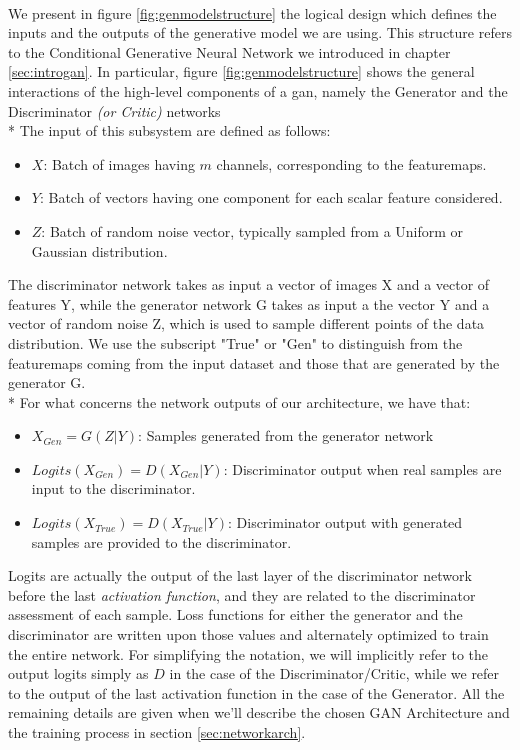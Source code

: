 \paragraph{} We present in figure \ref{fig:genmodelstructure} the logical design which defines the inputs and the outputs of the generative model we are using. This structure refers to the Conditional Generative Neural Network we introduced in chapter \ref{sec:introgan}. In particular, figure \ref{fig:genmodelstructure} shows the general interactions of the high-level components of a \gls{gan}, namely the Generator and the Discriminator \textit{(or Critic)} networks \\* The input of this subsystem are defined as follows:
\begin{itemize}
	\item $X$: Batch of images having $m$ channels, corresponding to the \glspl{featuremap}.
	\item $Y$: Batch of vectors having one component for each scalar feature considered.
	\item $Z$: Batch of random noise vector, typically sampled from a Uniform or Gaussian distribution.
\end{itemize}

The discriminator network takes as input a vector of images X and a vector of features Y, while the generator network G takes as input a the vector  Y and a vector of random noise Z, which is used to sample different points of the data distribution. We use the subscript "True" or "Gen" to distinguish from the \glspl{featuremap} coming from the input dataset and those that are generated by the generator G.
\\* For what concerns the network outputs of our architecture, we have that:
\begin{itemize}
	\item  $ X_{Gen} = G(Z|Y) $: Samples generated from the generator network
	\item  $ Logits(X_{Gen}) = D(X_{Gen}|Y) $: Discriminator output when real samples are input to the discriminator.
	\item  $ Logits(X_{True}) = D(X_{True}|Y) $: Discriminator output with generated samples are provided to the discriminator.
\end{itemize}	
Logits are actually the output of the last layer of the discriminator network before the last \textit{activation function}, and they are related to the discriminator assessment of each sample. Loss functions for either the generator and the discriminator are written upon those values and alternately optimized to train the entire network. For simplifying the notation, we will implicitly refer to the output logits simply as $D$ in the case of the Discriminator/Critic, while we refer to the output of the last activation function in the case of the Generator. All the remaining details are given when we'll describe the chosen GAN Architecture and the training process in section \ref{sec:networkarch}.

